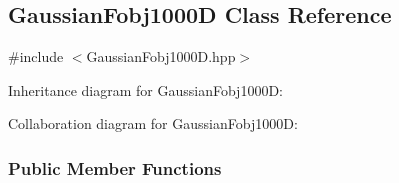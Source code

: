\hypertarget{classGaussianFobj1000D}{\subsection{\-Gaussian\-Fobj1000\-D \-Class \-Reference}
\label{classGaussianFobj1000D}
}


{\ttfamily \#include $<$\-Gaussian\-Fobj1000\-D.\-hpp$>$}



\-Inheritance diagram for \-Gaussian\-Fobj1000\-D\-:


\-Collaboration diagram for \-Gaussian\-Fobj1000\-D\-:
\subsubsection*{\-Public \-Member \-Functions}
